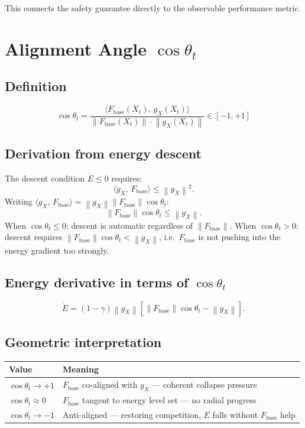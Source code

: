 \documentclass[11pt,a4paper]{article}
\theoremstyle{definition}
\newcommand{\norm}[1]{\left\|#1\right\|}
\newcommand{\inner}[2]{\langle #1,\,#2\rangle}
\newcommand{\Fbase}{F_{\mathrm{base}}}
\newcommand{\gX}{g_X}
\begin{document}
This connects the safety guarantee directly to the observable performance metric.

\section{Alignment Angle $\cos\theta_t$}

\subsection{Definition}

\begin{lockedbox}
\[
\cos\theta_t = \frac{\inner{\Fbase(X_t)}{\gX(X_t)}}{\norm{\Fbase(X_t)}\cdot\norm{\gX(X_t)}} \in [-1,+1]
\]
\end{lockedbox}

\subsection{Derivation from energy descent}

The descent condition $\dot E \leq 0$ requires:
\[
\inner{\gX}{\Fbase} \leq \norm{\gX}^2.
\]
Writing $\inner{\gX}{\Fbase} = \norm{\gX}\norm{\Fbase}\cos\theta_t$:
\[
\norm{\Fbase}\cos\theta_t \leq \norm{\gX}.
\]
When $\cos\theta_t \leq 0$: descent is automatic regardless of $\norm{\Fbase}$.
When $\cos\theta_t > 0$: descent requires $\norm{\Fbase}\cos\theta_t < \norm{\gX}$,
i.e.\ $\Fbase$ is not pushing into the energy gradient too strongly.

\subsection{Energy derivative in terms of $\cos\theta_t$}

\[
\dot E = (1-\gamma)\norm{\gX}\left[\norm{\Fbase}\cos\theta_t - \norm{\gX}\right].
\]

\subsection{Geometric interpretation}

\begin{center}
\begin{tabular}{ll}
\toprule
Value & Meaning \\
\midrule
$\cos\theta_t \to +1$ & $\Fbase$ co-aligned with $\gX$ — coherent collapse pressure \\
$\cos\theta_t \approx 0$ & $\Fbase$ tangent to energy level set — no radial progress \\
$\cos\theta_t \to -1$ & Anti-aligned — restoring competition, $E$ falls without $\Fbase$ help \\
\bottomrule
\end{tabular}
\end{center}
\end{document}
